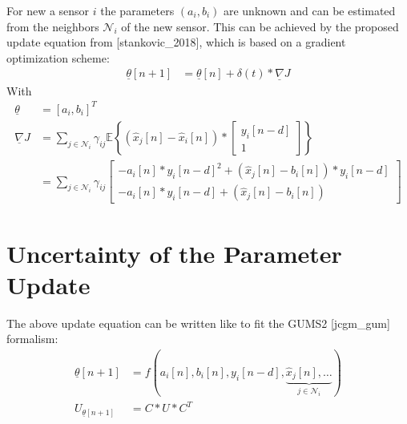 \documentclass[10pt,a4paper,onecolumn]{article}
\renewcommand{\vec}[1]{\underline{#1}}
\begin{document}
    For new a sensor $i$ the parameters $(a_i, b_i)$ are unknown and can be estimated from the neighbors $\mathcal{N}_i$ of the new sensor. This can be achieved by the proposed update equation from [stankovic\_2018], which is based on a gradient optimization scheme:
    \begin{align}
        \vec{\theta}[n+1] &= \vec{\theta}[n] + \delta(t) * \vec{\nabla} J  \label{eq:stankovic_main_update}
    \end{align}
    With
    \begin{align}
        \vec{\theta} &= [ a_i, b_i ]^T \\
        \vec{\nabla} J &=  \sum_{j \in \mathcal{N}_i} \gamma_{ij} \mathbb{E}\left\{ ( \hat{x}_j[n] - \hat{x}_i[n]) *
            \begin{bmatrix} y_i[n-d] \\ 1 \end{bmatrix} \right\} \nonumber \\
        &= \sum_{j \in \mathcal{N}_i} \gamma_{ij} \begin{bmatrix} - a_i[n]*{y_i[n-d]}^2 + (\hat{x}_j[n] - b_i[n]) * y_i[n-d]\\ - a_i[n]*y_i[n-d] + (\hat{x}_j[n] - b_i[n]) \end{bmatrix}
    \end{align}
    
    \section{Uncertainty of the Parameter Update}
    The above update equation can be written like to fit the GUMS2 [jcgm\_gum] formalism:
    \begin{align}
        \vec{\theta}[n+1] &= f(a_i[n], b_i[n], y_i[n-d], \underbrace{\hat{x}_j[n], \dots}_{j \in \mathcal{N}_i}) \\
        U_{\vec{\theta}[n+1]} &= C * U * C^T
    \end{align}
    
\end{document}
